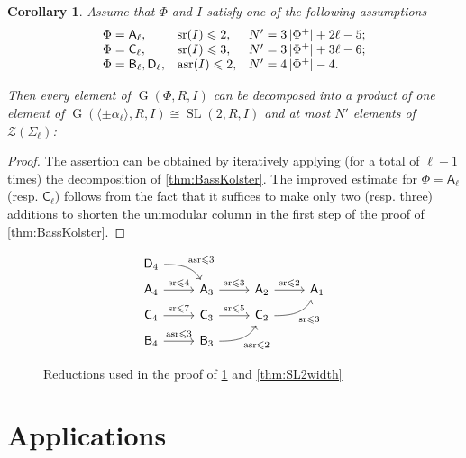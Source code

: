 \documentclass[11pt]{amsart}
\theoremstyle{plain}
\numberwithin{equation}{section}
\numberwithin{lemma}{section}
\newtheorem{cor}[lemma]{Corollary}
\theoremstyle{definition}
\theoremstyle{remark}
\DeclareMathOperator{\G}{G}
\DeclareMathOperator{\SL}{SL}
\DeclareMathOperator{\sr}{sr}
\DeclareMathOperator{\asr}{asr}
\newcommand{\rA}{\mathsf{A}}
\newcommand{\rB}{\mathsf{B}}
\newcommand{\rC}{\mathsf{C}}
\newcommand{\rD}{\mathsf{D}}
\begin{document}
\begin{cor}\label{cor:bass-kolster-iterated}
Assume that $\Phi$ and $I$ satisfy one of the following assumptions
\[\begin{array}{l@{\quad}l@{\quad}l}
\Phi=\rA_\ell, & \sr(I)\leqslant 2, & N'=3\left|\Phi^+\right|+2\ell - 5; \\
\Phi=\rC_\ell, & \sr(I)\leqslant 3, & N'=3\left|\Phi^+\right|+3\ell - 6; \\
\Phi=\rB_\ell, \rD_\ell, & \asr(I)\leqslant 2, & N'=4\left|\Phi^+\right| - 4.
\end{array}\]

Then every element of $\G(\Phi, R, I)$ can be decomposed into a product of one element of $\G(\langle\pm\alpha_\ell\rangle, R, I) \cong \SL(2, R, I)$ and at most $N'$ elements of $\mathcal{Z}(\Sigma_\ell)$:
\end{cor}
\begin{proof}
The assertion can be obtained by iteratively applying (for a total of $\ell-1$ times) the decomposition of \cref{thm:BassKolster}.
The improved estimate for $\Phi=\rA_\ell$ (resp. $\rC_\ell$) follows from the fact that it suffices to make only two (resp. three) additions to shorten the unimodular column in the first step of the proof of \cref{thm:BassKolster}.
\end{proof}

\begin{figure}[hb]\label{fig:bass-kolster}
\[\begin{tikzcd}[row sep=tiny]
\rD_4 \arrow[out=0, in=120]{rd}{\asr\leqslant3} & & & \\
\rA_4 \arrow{r}{\sr\leqslant4} & \rA_3 \arrow{r}{\sr\leqslant3} & \rA_2 \arrow{r}{\sr\leqslant2} & \rA_1 \\
\rC_4 \arrow{r}{\sr\leqslant7} & \rC_3 \arrow{r}{\sr\leqslant5} & \rC_2 \arrow[out=0, in=-120, swap]{ru}{\sr\leqslant3} \\
\rB_4 \arrow{r}{\asr\leqslant3} & \rB_3 \arrow[out=0, in=-120, swap]{ru}{\asr\leqslant2} & &
\end{tikzcd}\] \caption{Reductions used in the proof of \cref{cor:bass-kolster-iterated} and \cref{thm:SL2width}} \end{figure}

\section{Applications} \label{sec:applications}
\end{document}
